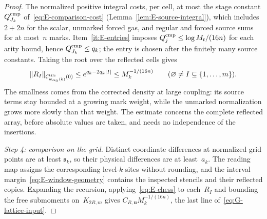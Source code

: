 \begin{proof}
The normalized positive integral costs, per cell, at most the stage constant $Q_{J_k}^{\rm cmp}$ of~\eqref{eq:E-comparison-cost} (Lemma~\ref{lem:E-source-integral}), which includes $2+2n$ for the scalar, unmarked forced gas, and regular and forced source sums for at most~$n$ marks. Item~\ref{it:E-entries} imposes $Q_j^{\rm cmp}\le\log M_t/(16n)$ for each arity bound, hence $Q_{J_k}^{\rm cmp}\le q_k$; the entry is chosen after the finitely many source constants. Taking the root over the reflected cells gives
\begin{equation}\label{eq:G-source-root}
\|R_I\|_{\mathcal C^{\rm tile}_{w_{\alpha_0}(k)}(0)}
\le e^{q_k-2q_k|I|}\le M_k^{-1/(16n)}
\qquad(\varnothing\ne I\subseteq\{1,\ldots,m\}).
\end{equation}
The smallness comes from the corrected density at large coupling: its source terms stay bounded at a growing mark weight, while the unmarked normalization grows more slowly than that weight. The estimate concerns the complete reflected array, before absolute values are taken, and needs no independence of the insertions.

\emph{Step 4: comparison on the grid.} Distinct coordinate differences at normalized grid points are at least $\mathfrak s_k$, so their physical differences are at least~$a_k$. The reading map assigns the corresponding level-$k$ sites without rounding, and the interval margin~\eqref{eq:E-window-geometry} contains the inspected stencils and their reflected copies. Expanding the recursion, applying~\eqref{eq:E-chess} to each~$R_I$ and bounding the free submoments on~$K_{2R,m}$ gives $C_{R,\boldsymbol u}M_k^{-1/(16n)}$, the last line of~\eqref{eq:G-lattice-input}.


\end{proof}
